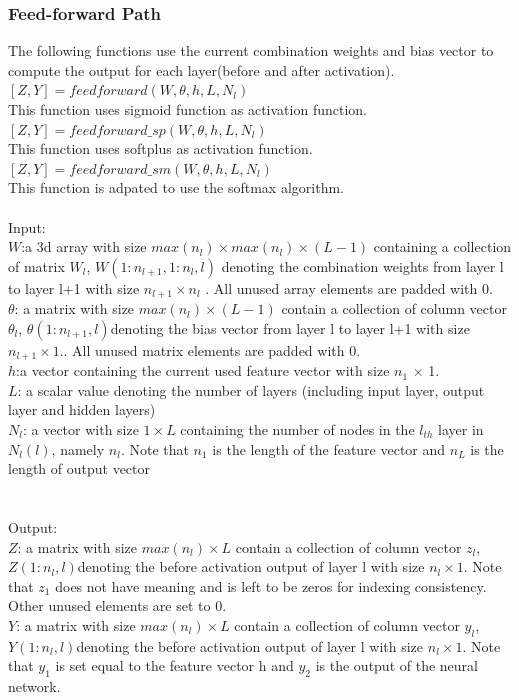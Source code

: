 \documentclass[journal,a4paper,onecolumn,11pt]{IEEEtran}
\begin{document}
\subsubsection{Feed-forward Path}
The following functions use the current combination weights and bias vector to compute the output for each layer(before and after activation).\\
$[Z,Y] = feedforward(W,\theta,h,L,N_{l})$\\ 
This function uses sigmoid function as activation function.\\
$[Z,Y] = feedforward\_sp(W,\theta,h,L,N_{l})$\\ 
This function uses softplus as activation function.\\
$[Z,Y] = feedforward\_sm(W,\theta,h,L,N_{l})$\\ 
This function is adpated to use the softmax algorithm.\\\\
Input:\\
$W$:a 3d array with size $max(n_{l})\times max(n_{l}) \times (L-1)$ containing a collection of matrix $W_{l}$, $W(1:n_{l+1},1:n_{l},l)$ denoting the combination weights from layer l to layer l+1 with size $n_{l+1} \times n_{l}$ . All unused array elements are padded with 0. \\
$\theta$: a matrix with size $max(n_{l}) \times (L-1)$ contain a collection of column vector $\theta_{l}$, $\theta(1:n_{l+1},l)$denoting the bias vector from layer l to layer l+1 with size $n_{l+1} \times 1$.. All unused matrix elements are padded with 0. \\ 
$h$:a vector containing the current used feature vector with size $n_1$ $\times$ 1.\\
$L$:  a scalar value denoting the number of layers (including input layer, output layer and hidden layers)\\
$N_{l}$: a vector with size  $1\times L$ containing the number of nodes in the $l_{th}$ layer in $N_{l}(l)$, namely  $n_{l}$. Note that $n_1$ is the length of the feature vector and $n_L$ is the length of output vector \\
\\\\
Output:\\
$Z$: a matrix with size $max(n_{l}) \times L$ contain a collection of column vector $z_{l}$, $Z(1:n_{l},l)$denoting the before activation output of layer l with size $n_{l} \times 1$. Note that $z_1$ does not have meaning and is left to be zeros for indexing consistency. Other unused elements are set to 0. \\
$Y$: a matrix with size $max(n_{l}) \times L$ contain a collection of column vector $y_{l}$, $Y(1:n_{l},l)$denoting the before activation output of layer l with size $n_{l} \times 1$. Note that $y_1$ is set equal to the feature vector h and $y_2$ is the output of the neural network.  
\pagebreak
\end{document}
